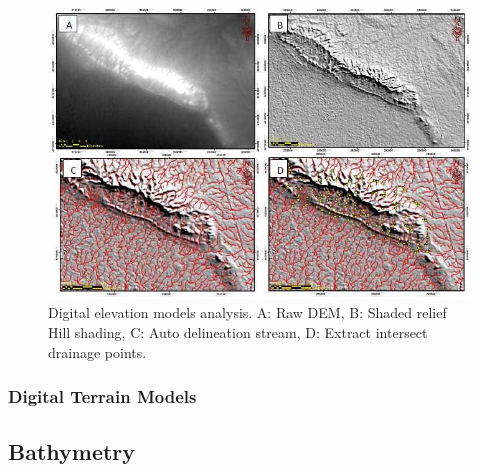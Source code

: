 \documentclass{article}
\begin{document}

\begin{figure}
    \centering
    \includegraphics[width=1.0\linewidth]{images/dem-examples.png}
    \caption{Digital elevation models analysis. A: Raw DEM, B: Shaded relief Hill shading, C: Auto delineation stream, D: Extract intersect drainage points.}
    \label{figure30}
\end{figure}

\subsubsection{Digital Terrain Models}




\subsection{Bathymetry}

\end{document}
